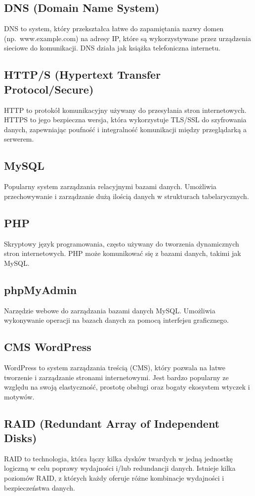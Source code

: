 \documentclass[a4paper]{article}
\begin{document}
\subsection{DNS (Domain Name System)}
DNS to system, który przekształca łatwe do zapamiętania nazwy domen (np.\ www.example.com) na adresy IP, które są wykorzystywane przez urządzenia sieciowe do komunikacji. DNS działa jak książka telefoniczna internetu.

\subsection{HTTP/S (Hypertext Transfer Protocol/Secure)}
HTTP to protokół komunikacyjny używany do przesyłania stron internetowych. HTTPS to jego bezpieczna wersja, która wykorzystuje TLS/SSL do szyfrowania danych, zapewniając poufność i integralność komunikacji między przeglądarką a serwerem.

\subsection{MySQL}
Popularny system zarządzania relacyjnymi bazami danych. Umożliwia przechowywanie i zarządzanie dużą ilością danych w strukturach tabelarycznych.

\subsection{PHP}
Skryptowy język programowania, często używany do tworzenia dynamicznych stron internetowych. PHP może komunikować się z bazami danych, takimi jak MySQL.

\subsection{phpMyAdmin}
Narzędzie webowe do zarządzania bazami danych MySQL.
Umożliwia wykonywanie operacji na bazach danych za pomocą interfejsu graficznego.

\subsection{CMS WordPress}
WordPress to system zarządzania treścią (CMS), który pozwala na łatwe tworzenie i zarządzanie stronami internetowymi. Jest bardzo popularny ze względu na swoją elastyczność, prostotę obsługi oraz bogaty ekosystem wtyczek i motywów.

\subsection{RAID (Redundant Array of Independent Disks)}
RAID to technologia, która łączy kilka dysków twardych w jedną jednostkę logiczną w celu poprawy wydajności i/lub redundancji danych. Istnieje kilka poziomów RAID, z których każdy oferuje różne kombinacje wydajności i bezpieczeństwa danych.
\end{document}
